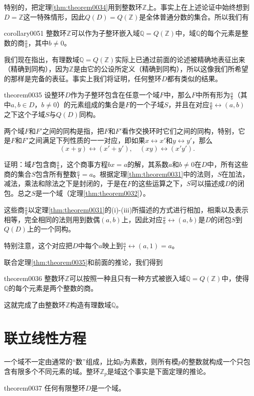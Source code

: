 特别的，把定理\ref{thm:theorem0034}用到整数环$\mathbb{Z}$上。事实上在上述论证中始终想到$D=\mathbb{Z}$这一特殊情形，因此$Q(D)=Q(\mathbb{Z})$是全体普通分数的集合。所以我们有
\begin{corollary}{}{corollary0051}
整数环$\mathbb{Z}$可以作为子整环嵌入域$\mathbb{Q}=Q(\mathbb{Z})$中，域$\mathbb{Q}$的每个元素是整数的商$\frac{a}{b}$，其中$b \neq 0$。
\end{corollary}

我们现在指出，有理数域$\mathbb{Q}=Q(\mathbb{Z})$实际上已通过前面的论述被精确地表征出来（精确到同构），因为$\mathbb{Z}$是由它的公设所定义（精确到同构），所以这像我们所希望的那样是完备的表征。事实上我们将证明，任何整环$D$都有类似的结果。
\begin{theorem}{}{theorem0035}
设整环$D$作为子整环包含在任意一个域$F$中，那么$F$中所有形为$\frac{a}{b}$（其中$a, b \in D$，$b \neq 0$）的元素组成的集合是$F$的一个子域$S$，并且在对应$\frac{a}{b} \leftrightarrow (a, b)$之下这个子域$S$与$Q(D)$同构。
\end{theorem}
两个域$F$和$F'$之间的同构是指，把$F$和$F'$看作交换环时它们之间的同构，特别，它是$F$和$F'$之间满足下列性质的一一对应，即如果$x \leftrightarrow x'$和$y \leftrightarrow y'$，那么
\[
(x+y) \leftrightarrow (x'+y'), \quad (xy) \leftrightarrow (x'y').
\]

证明：域$F$包含商$\frac{a}{b}$，这个商事方程$bx=a$的解，其系数$a$和$b \neq 0$在$D$中，所有这些商的集合$S$包含所有整数$\frac{a}{1}=a$。根据定理\ref{thm:theorem0031}中的法则，$S$在加法，减法，乘法和除法之下是封闭的，于是在$F$的这些运算之下，$S$可以描述成$D$的闭包。总之$S$是一个域（定理\ref{thm:theorem0032}）。

这些商$\frac{a}{b}$以定理\ref{thm:theorem0031}的(i)-(iii)所描述的方式进行相加，相乘以及表示相等，完全相同的法则用到数偶$(a,b)$上，因此对应$\frac{a}{b} \leftrightarrow (a, b)$是$D$的闭包$S$到$Q(D)$上的一个同构。

特别注意，这个对应把$D$中每个$a$映上到$\frac{a}{1} \leftrightarrow (a,1)=a$。

联合定理\ref{thm:theorem0035}和前面的推论，我们得到
\begin{theorem}{}{theorem0036}
整数环$\mathbb{Z}$可以按照一种且只有一种方式被嵌入域$\mathbb{Q}=Q(\mathbb{Z})$中，使得$\mathbb{Q}$的每个元素是两个整数的商。
\end{theorem}

这就完成了由整数环$\mathbb{Z}$构造有理数域$\mathbb{Q}$。

\section{联立线性方程}
一个域不一定由通常的“数”组成，比如$p$为素数，则所有模$p$的整数就构成一个只包含有限多个不同元素的域。整环$\mathbb{Z}_p$是域这个事实是下面定理的推论。
\begin{theorem}{}{theorem0037}
任何有限整环$D$是一个域。
\end{theorem}

